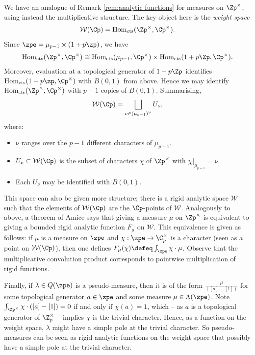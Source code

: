 \documentclass[a4paper,10pt, english, reqno]{smfart}
\newcommand{\Homc}{\mathrm{Hom}_{\mathrm{cts}}}
\newcommand{\cW}{\mathcal{W}}
\numberwithin{equation}{section}
\begin{document}
	
\begin{remark}\label{rem:weight space rigid analytic}
We have an analogue of Remark \ref{rem:analytic functions} for measures on $\Zp^\times$, using instead the multiplicative structure. The key object here is the \emph{weight space} 
 \[\mathcal{W}(\Cp) = \mathrm{Hom}_{\mathrm{cts}}(\Zp^\times,\Cp^\times). \]
 Since $\zpe = \mu_{p - 1} \times (1 + p \zp)$, we have 
 \[
 \Homc(\Zp^\times,\Cp^\times) \cong \Homc(\mu_{p-1},\Cp^\times) \times \Homc(1+p\Zp, \Cp^\times).
 \]
Moreover, evaluation at a topological generator of $1+p\Zp$ identifies $\Homc(1+p\zp,\Cp^\times)$ with $B(0,1)$ from above. Hence we may identify $\Homc(\Zp^\times,\Cp^\times)$ with $p-1$ copies of $B(0,1)$. Summarising,
\[
\cW(\Cp)  = \bigsqcup_{\nu \in (\mu_{p-1})^\vee} U_\nu,
\]
where:
\begin{itemize}
    \item $\nu$ ranges over the $p-1$ different characters of $\mu_{p-1}$.
    \item $U_\nu \subset \cW(\Cp)$ is the subset of characters $\chi$ of $\Zp^\times$ with $\chi|_{\mu_{p-1}} = \nu$.
    \item Each $U_\nu$ may be identified with $B(0,1)$.  
\end{itemize}
 
 
 This space can also be given more structure; there is a rigid analytic space $\mathcal{W}$ such that the elements of $\mathcal{W}(\Cp)$ are the $\Cp$-points of $\mathcal{W}$. Analogously to above, a theorem of Amice says that giving a measure $\mu$ on $\Zp^\times$ is equivalent to giving a bounded rigid analytic function $F_\mu$ on $\mathcal{W}$. This equivalence is given as follows: if $\mu$ is a measure on $\zpe$ and $\chi : \zpe \to \C_p^\times$ is a character (seen as a point on $\mathcal{W}(\Cp)$), then one defines $F_\mu(\chi) \defeq \int_{\zpe} \chi \cdot \mu$. Observe that the multiplicative convolution product corresponds to pointwise multiplication of rigid functions. 
 
 Finally, if $\lambda \in Q(\zpe)$ is a pseudo-measure, then it is of the form $\frac{\mu}{([a] - [1])}$ for some topological generator $a \in \zpe$ and some measure $\mu \in \Lambda(\zpe)$. Note $\int_{\Zp^\times} \chi \cdot ([a]-[1]) = 0$ if and only if $\chi(a) = 1$, which -- as $a$ is a topological generator of $\Z_p^\times$ -- implies $\chi$ is the trivial character. Hence, as a function on the weight space, $\lambda$ might have a simple pole at the trivial character. So pseudo-measures can be seen as rigid analytic functions on the weight space that possibly have a simple pole at the trivial character.
\end{remark}
\end{document}
